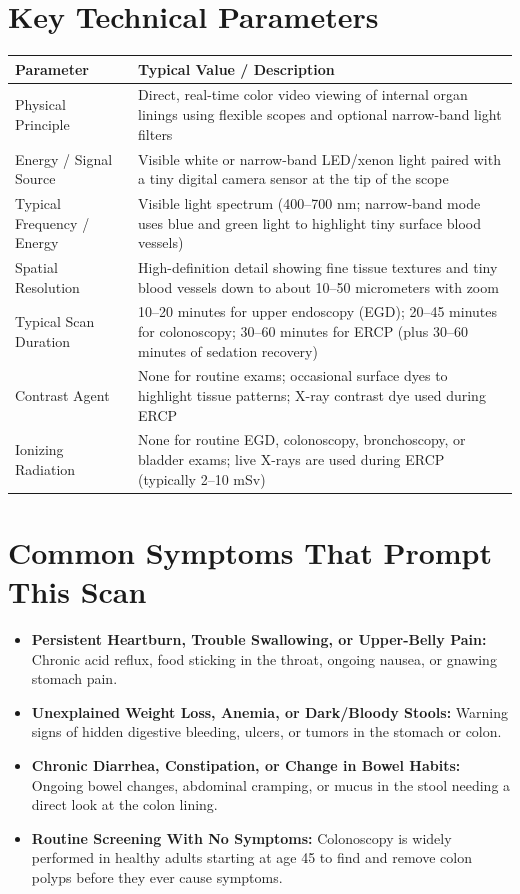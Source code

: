 \section{Key Technical Parameters}
\noindent
\begin{tabularx}{\textwidth}{@{}l X@{}}
\toprule
\textbf{Parameter} & \textbf{Typical Value / Description} \\
\midrule
Physical Principle & Direct, real-time color video viewing of internal organ linings using flexible scopes and optional narrow-band light filters \\
Energy / Signal Source & Visible white or narrow-band LED/xenon light paired with a tiny digital camera sensor at the tip of the scope \\
Typical Frequency / Energy & Visible light spectrum (400--700 nm; narrow-band mode uses blue and green light to highlight tiny surface blood vessels) \\
Spatial Resolution & High-definition detail showing fine tissue textures and tiny blood vessels down to about 10--50 micrometers with zoom \\
Typical Scan Duration & 10--20 minutes for upper endoscopy (EGD); 20--45 minutes for colonoscopy; 30--60 minutes for ERCP (plus 30--60 minutes of sedation recovery) \\
Contrast Agent & None for routine exams; occasional surface dyes to highlight tissue patterns; X-ray contrast dye used during ERCP \\
Ionizing Radiation & None for routine EGD, colonoscopy, bronchoscopy, or bladder exams; live X-rays are used during ERCP (typically 2--10 mSv) \\
\bottomrule
\end{tabularx}

\section{Common Symptoms That Prompt This Scan}
\begin{itemize}
\item \textbf{Persistent Heartburn, Trouble Swallowing, or Upper-Belly Pain:} Chronic acid reflux, food sticking in the throat, ongoing nausea, or gnawing stomach pain.
\item \textbf{Unexplained Weight Loss, Anemia, or Dark/Bloody Stools:} Warning signs of hidden digestive bleeding, ulcers, or tumors in the stomach or colon.
\item \textbf{Chronic Diarrhea, Constipation, or Change in Bowel Habits:} Ongoing bowel changes, abdominal cramping, or mucus in the stool needing a direct look at the colon lining.
\item \textbf{Routine Screening With No Symptoms:} Colonoscopy is widely performed in healthy adults starting at age 45 to find and remove colon polyps before they ever cause symptoms.
\end{itemize}

